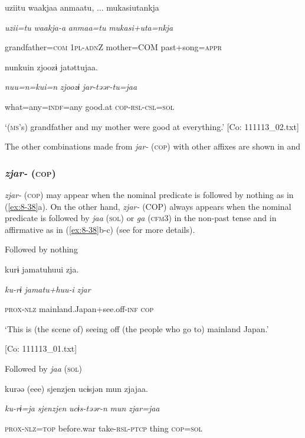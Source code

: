 \ex  {\TM}
\glll  uziitu  waakjaa  anmaatu, ...  mukasiutankja

      \textit{uzii=tu}  \textit{waakja-a}  \textit{anmaa=tu}  \textit{mukasi+uta=nkja}

      grandfather=\textsc{com}  1\textsc{pl}-\textsc{adn}Z  mother=COM  past+song=\textsc{appr}

      nunkuin  zjoozɨ  jatəttujaa.

      \textit{nuu=n=kui=n}  \textit{zjoozɨ}  \textit{jar-təər-tu=jaa}

      what=any=\textsc{indf}=any  good.at  \textsc{cop}-\textsc{rsl}-\textsc{csl}=\textsc{sol}

\glt ‘(\textsc{ms}’s) grandfather and my mother were good at everything.’ [Co: 111113\_02.txt]
\z

  The other combinations made from \textit{jar-} (\textsc{cop}) with other affixes are shown in  and 

\subsubsection{\textit{zjar-} (\textsc{cop})}

\textit{zjar-} (\textsc{cop}) may appear when the nominal predicate is followed by nothing as in (\ref{ex:8-38}a). On the other hand, \textit{zjar-} (COP) always appears when the nominal predicate is followed by \textit{jaa} (\textsc{sol}) or \textit{ga} (\textsc{cfm}3) in the non-past tense and in affirmative as in (\ref{ex:8-38}b-c) (see  for more details).

\ea\label{ex:8-38}
\ea Followed by nothing

  {\TM}
\glll  kurɨ  jamatuhuui  zja.

    \textit{ku-rɨ}  \textit{jamatu+huu-i}  \textit{zjar}

    \textsc{prox}-\textsc{nlz}  mainland.Japan+see.off-\textsc{inf}  \textsc{cop}

    ‘This is (the scene of) seeing off (the people who go to) mainland Japan.’

    [Co: 111113\_01.txt]
\z

\ex Followed by \textit{jaa} (\textsc{sol})

  {\TM}
\glll  kurəə  (eee)  sjenzjen  ucɨsjən  mun  zjajaa.

    \textit{ku-rɨ=ja}    \textit{sjenzjen}  \textit{ucɨs-təər-n}  \textit{mun}  \textit{zjar=jaa}

    \textsc{prox}-\textsc{nlz}=\textsc{top}    before.war  take-\textsc{rsl}-\textsc{ptcp}  thing  \textsc{cop}=\textsc{sol}

